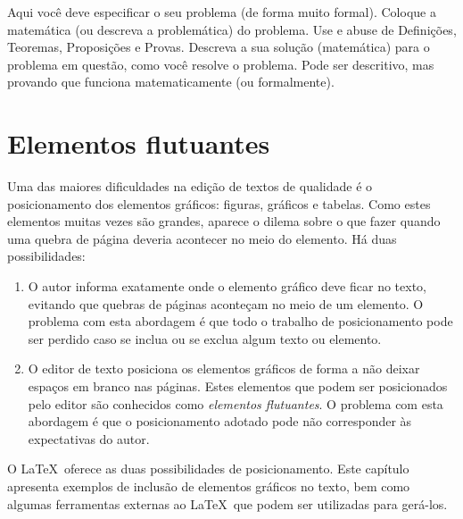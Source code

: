 
\label{Cap:Problema}

Aqui você deve especificar o seu problema (de forma muito formal). Coloque a matemática (ou descreva a problemática) do problema. Use e abuse de Definições, Teoremas, Proposições e Provas. Descreva a sua solução (matemática) para o problema em questão, como você resolve o problema.
Pode ser descritivo, mas provando que funciona matematicamente (ou formalmente).

\section{Elementos flutuantes}
\label{Sec:flutuantes}

Uma das maiores dificuldades na edição de textos de qualidade é o
posicionamento dos elementos gráficos: figuras, gráficos e
tabelas. Como estes elementos muitas vezes são grandes, aparece o
dilema sobre o que fazer quando uma quebra de página deveria acontecer
no meio do elemento. Há duas possibilidades:
\begin{enumerate}
\item O autor informa exatamente onde o elemento gráfico deve ficar no
texto, evitando que quebras de páginas aconteçam no meio de um
elemento. O problema com esta abordagem é que todo o trabalho de
posicionamento pode ser perdido caso se inclua ou se exclua algum
texto ou elemento.
\item O editor de texto posiciona os elementos gráficos de forma a não
deixar espaços em branco nas páginas. Estes elementos que podem ser
posicionados pelo editor são conhecidos como \emph{elementos
flutuantes}. O problema com esta abordagem é que o posicionamento
adotado pode não corresponder às expectativas do autor.
\end{enumerate}

O \LaTeX\ oferece as duas possibilidades de posicionamento. Este
capítulo apresenta exemplos de inclusão de elementos gráficos no
texto, bem como algumas ferramentas externas ao \LaTeX\ que podem ser
utilizadas para gerá-los.

